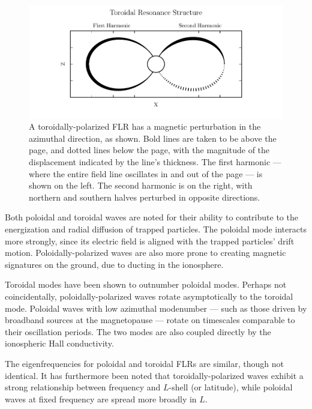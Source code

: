 \begin{figure}[!htb]
  \centering
  \includegraphics[width=\textwidth]{figures/toroidal.pdf}
  \caption[Toroidal Mode Structure]{
    A toroidally-polarized FLR has a magnetic perturbation in the azimuthal
    direction, as shown. Bold lines are taken to be above the page, and dotted
    lines below the page, with the magnitude of the displacement indicated by
    the line's thickness.
    The first harmonic --- where the entire field line oscillates in and out of
    the page --- is shown on the left. The second harmonic is on the right,
    with northern and southern halves perturbed in opposite directions. 
  }
  \label{fig_toroidal}
\end{figure}

Both poloidal and toroidal waves are noted for their ability to contribute to
the energization and radial diffusion of trapped particles. The poloidal mode
interacts more strongly, since its electric field is aligned with the trapped
particles' drift motion. Poloidally-polarized waves are also more prone to
creating magnetic signatures on the ground, due to ducting in the
ionosphere\cite{fujita_1988,greifinger_1968}. 

Toroidal modes have been shown to outnumber poloidal modes\cite{anderson_1990}.
Perhaps not coincidentally, poloidally-polarized waves rotate asymptotically to
the toroidal mode\cite{mann_1995,mann_1997,radoski_1974}. Poloidal waves with
low azimuthal modenumber --- such as those driven by broadband sources at the
magnetopause --- rotate on timescales comparable to their oscillation periods.
The two modes are also coupled directly by the ionospheric Hall
conductivity\cite{kato_1956}. 

The eigenfrequencies for poloidal and toroidal FLRs are similar, though not
identical\cite{green_1985}. It has furthermore been noted that
toroidally-polarized waves exhibit a strong relationship between frequency and
$L$-shell (or latitude), while poloidal waves at fixed frequency are spread
more broadly in $L$\cite{engebretson_1986}. 

